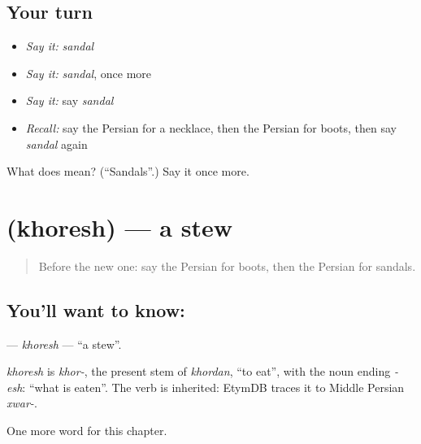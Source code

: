 \subsection*{Your turn}
\begin{itemize}
\raggedright
  \item \emph{Say it:} \emph{sandal}
  \item \emph{Say it:} \emph{sandal}, once more
  \item \emph{Say it:} say \emph{sandal}
  \item \emph{Recall:} say the Persian for a necklace, then the Persian for boots, then say \emph{sandal} again
\end{itemize}

\begin{tcolorbox}[breakable,colback=teal!4,colframe=teal!35!black,title={Before you move on}]
What does  mean? (\textquotedblleft{}Sandals\textquotedblright{}.) Say it once more.
\end{tcolorbox}
\section[\texorpdfstring{\fa{خورش} (khoresh)}{خورش (khoresh)}]{ (khoresh) — a stew}

\label{lesson:FA-C98-khoresh}



\begin{quote}
Before the new one: say the Persian for boots, then the Persian for sandals.
\end{quote}

\subsection*{You'll want to know: }
\textbf{} — \emph{khoresh} — \textquotedblleft{}a stew\textquotedblright{}.

\begin{cousinweb}
\emph{khoresh} is \emph{khor-}, the present stem of \emph{khordan}, \textquotedblleft{}to eat\textquotedblright{}, with the noun ending \emph{-esh}: \textquotedblleft{}what is eaten\textquotedblright{}. The verb is inherited: EtymDB traces it to Middle Persian \emph{xwar-}.
\end{cousinweb}

\begin{grammarlens}[title={What you've built}]
One more word for this chapter.
\end{grammarlens}

